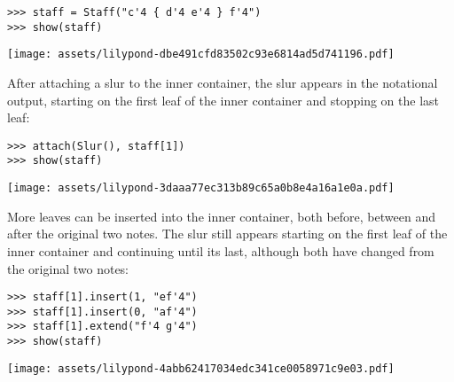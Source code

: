 \begin{abjadbookoutput}
\begin{singlespacing}
\vspace{-0.5\baselineskip}
\begin{lstlisting}
>>> staff = Staff("c'4 { d'4 e'4 } f'4")
>>> show(staff)
\end{lstlisting}
\noindent\texttt{[image: assets/lilypond-dbe491cfd83502c93e6814ad5d741196.pdf]}
\end{singlespacing}
\end{abjadbookoutput}

\noindent After attaching a slur to the inner container, the slur appears in
the notational output, starting on the first leaf of the inner container and
stopping on the last leaf:

\begin{comment}
<abjad>
attach(Slur(), staff[1])
show(staff)
</abjad>
\end{comment}

\begin{abjadbookoutput}
\begin{singlespacing}
\vspace{-0.5\baselineskip}
\begin{lstlisting}
>>> attach(Slur(), staff[1])
>>> show(staff)
\end{lstlisting}
\noindent\texttt{[image: assets/lilypond-3daaa77ec313b89c65a0b8e4a16a1e0a.pdf]}
\end{singlespacing}
\end{abjadbookoutput}

\noindent More leaves can be inserted into the inner container, both before,
between and after the original two notes. The slur still appears starting on
the first leaf of the inner container and continuing until its last, although
both have changed from the original two notes:

\begin{comment}
<abjad>
staff[1].insert(1, "ef'4")
staff[1].insert(0, "af'4")
staff[1].extend("f'4 g'4")
show(staff)
</abjad>
\end{comment}

\begin{abjadbookoutput}
\begin{singlespacing}
\vspace{-0.5\baselineskip}
\begin{lstlisting}
>>> staff[1].insert(1, "ef'4")
>>> staff[1].insert(0, "af'4")
>>> staff[1].extend("f'4 g'4")
>>> show(staff)
\end{lstlisting}
\noindent\texttt{[image: assets/lilypond-4abb62417034edc341ce0058971c9e03.pdf]}
\end{singlespacing}
\end{abjadbookoutput}


